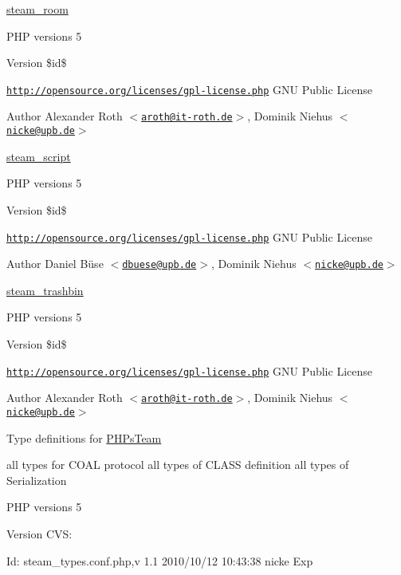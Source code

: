\hyperlink{classsteam__room}{steam\_\-room}

PHP versions 5

\begin{DoxyVersion}{Version}
\$id\$
\end{DoxyVersion}
\href{http://opensource.org/licenses/gpl-license.php}{\tt http://opensource.org/licenses/gpl-\/license.php} GNU Public License \begin{DoxyAuthor}{Author}
Alexander Roth $<$\href{mailto:aroth@it-roth.de}{\tt aroth@it-\/roth.de}$>$, Dominik Niehus $<$\href{mailto:nicke@upb.de}{\tt nicke@upb.de}$>$
\end{DoxyAuthor}
\hyperlink{classsteam__script}{steam\_\-script}

PHP versions 5

\begin{DoxyVersion}{Version}
\$id\$
\end{DoxyVersion}
\href{http://opensource.org/licenses/gpl-license.php}{\tt http://opensource.org/licenses/gpl-\/license.php} GNU Public License \begin{DoxyAuthor}{Author}
Daniel Büse $<$\href{mailto:dbuese@upb.de}{\tt dbuese@upb.de}$>$, Dominik Niehus $<$\href{mailto:nicke@upb.de}{\tt nicke@upb.de}$>$
\end{DoxyAuthor}
\hyperlink{classsteam__trashbin}{steam\_\-trashbin}

PHP versions 5

\begin{DoxyVersion}{Version}
\$id\$
\end{DoxyVersion}
\href{http://opensource.org/licenses/gpl-license.php}{\tt http://opensource.org/licenses/gpl-\/license.php} GNU Public License \begin{DoxyAuthor}{Author}
Alexander Roth $<$\href{mailto:aroth@it-roth.de}{\tt aroth@it-\/roth.de}$>$, Dominik Niehus $<$\href{mailto:nicke@upb.de}{\tt nicke@upb.de}$>$
\end{DoxyAuthor}
Type definitions for \hyperlink{namespace_p_h_ps_team}{PHPsTeam}

all types for COAL protocol all types of CLASS definition all types of Serialization

PHP versions 5

\begin{DoxyVersion}{Version}
CVS: 
\end{DoxyVersion}
\begin{DoxyParagraph}{Id:}
steam\_\-types.conf.php,v 1.1 2010/10/12 10:43:38 nicke Exp 
\end{DoxyParagraph}


